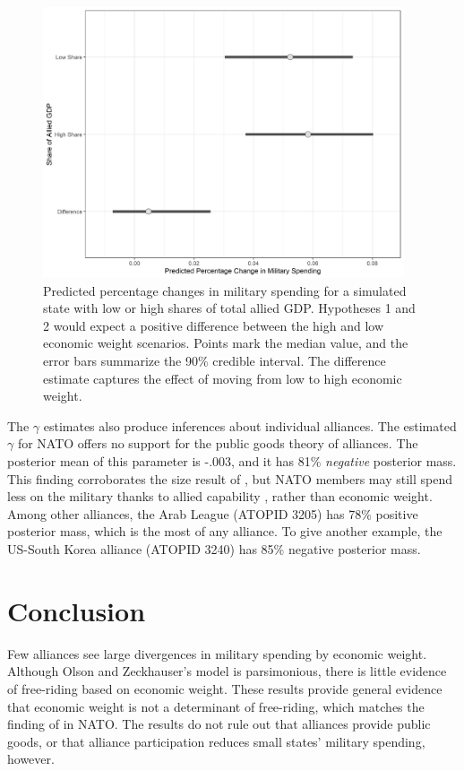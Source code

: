\documentclass[12pt]{article}
\begin{document}
\begin{figure}[htbp]
	\centering
		\includegraphics[width=0.95\textwidth]{pred-change-share.png}
	\caption{Predicted percentage changes in military spending for a simulated state with low or high shares of total allied GDP. Hypotheses 1 and 2 would expect a positive difference between the high and low economic weight scenarios. Points mark the median value, and the error bars summarize the 90\% credible interval. The difference estimate captures the effect of moving from low to high economic weight.}
	\label{fig:pred-change-share}
\end{figure}


The $\gamma$ estimates also produce inferences about individual alliances.
The estimated $\gamma$ for NATO offers no support for the public goods theory of alliances. 
The posterior mean of this parameter is -.003, and it has 81\% \emph{negative} posterior mass.  
This finding corroborates the size result of \citet{PluemperNeumayer2015}, but NATO members may still spend less on the military thanks to allied capability \citep{GeorgeSandler2017}, rather than economic weight.
Among other alliances, the Arab League (ATOPID 3205) has 78\% positive posterior mass, which is the most of any alliance. 
To give another example, the US-South Korea alliance (ATOPID 3240) has 85\% negative posterior mass. 


\section{Conclusion}

Few alliances see large divergences in military spending by economic weight. 
Although Olson and Zeckhauser's model is parsimonious, there is little evidence of free-riding based on economic weight. 
These results provide general evidence that economic weight is not a determinant of free-riding, which matches the finding of \citet{PluemperNeumayer2015} in NATO. 
The results do not rule out that alliances provide public goods, or that alliance participation reduces small states' military spending, however. 
\end{document}
